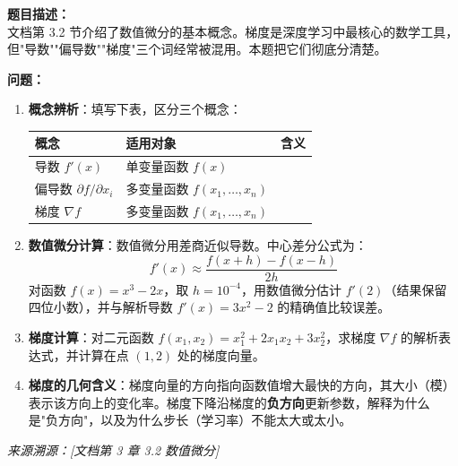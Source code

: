 \documentclass[a4paper,11pt]{ctexart}
\begin{document}
\begin{problembox}
    \textbf{题目描述：}\\
    文档第 3.2 节介绍了数值微分的基本概念。梯度是深度学习中最核心的数学工具，但"导数""偏导数""梯度"三个词经常被混用。本题把它们彻底分清楚。

    \vspace{0.3cm}
    \textbf{问题：}
    \begin{enumerate}[(1)]
        \item \textbf{概念辨析}：填写下表，区分三个概念：

        \begin{center}
        \begin{tabular}{p{2.2cm} p{4.0cm} p{4.5cm}}
            \toprule
            概念 & 适用对象 & 含义 \\
            \midrule
            导数 $f'(x)$ & 单变量函数 $f(x)$ & \underline{\hspace{4cm}} \\[1.2em]
            偏导数 $\partial f/\partial x_i$ & 多变量函数 $f(x_1,\ldots,x_n)$ & \underline{\hspace{4cm}} \\[1.2em]
            梯度 $\nabla f$ & 多变量函数 $f(x_1,\ldots,x_n)$ & \underline{\hspace{4cm}} \\
            \bottomrule
        \end{tabular}
        \end{center}

        \item \textbf{数值微分计算}：数值微分用差商近似导数。中心差分公式为：
        \[
        f'(x) \approx \frac{f(x+h) - f(x-h)}{2h}
        \]
        对函数 $f(x) = x^3 - 2x$，取 $h = 10^{-4}$，用数值微分估计 $f'(2)$（结果保留四位小数），并与解析导数 $f'(x) = 3x^2 - 2$ 的精确值比较误差。

        \item \textbf{梯度计算}：对二元函数 $f(x_1, x_2) = x_1^2 + 2x_1x_2 + 3x_2^2$，求梯度 $\nabla f$ 的解析表达式，并计算在点 $(1, 2)$ 处的梯度向量。

        \item \textbf{梯度的几何含义}：梯度向量的方向指向函数值增大最快的方向，其大小（模）表示该方向上的变化率。梯度下降沿梯度的\textbf{负方向}更新参数，解释为什么是"负方向"，以及为什么步长（学习率）不能太大或太小。
    \end{enumerate}

    \vspace{0.2cm}
    {\color{gray}\small\textit{来源溯源：[文档第 3 章 3.2 数值微分]}}
\end{problembox}
\end{document}

